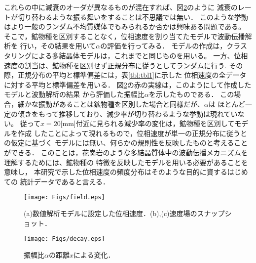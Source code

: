 これらの中に減衰のオーダが異なるものが混在すれば、図\ref{fig:fig17}のように
減衰のレートが切り替わるような振る舞いをすることは不思議では無い．
このような挙動はより一般のランダム不均質媒体でもみられるか否かは興味ある問題である。
そこで，鉱物種を区別することなく，位相速度を割り当てたモデルで波動伝播解析を
行い，その結果を用いて$\alpha$の評価を行ってみる．
モデルの作成は，クラスタリングによる多結晶体モデルは，これまでと同じものを用いる。
一方、位相速度の割当は、鉱物種を区別せず正規分布に従うとしてランダムに行う.
その際，正規分布の平均と標準偏差には，表\ref{tbl:tbl1}に示した
位相速度の全データに対する平均と標準偏差を用いる．
図\ref{fig:fig17}の赤の実線は，このようにして作成したモデルと波動解析の結果
から評価した振幅比$\alpha$を示したものである．
この場合，細かな振動があることは鉱物種を区別した場合と同様だが、$\alpha$は
ほとんど一定の傾きをもって推移しており、減少率が切り替わるような挙動は現れていない。
従って$x=20$[mm]付近に見られる減少率の変化は，鉱物種を区別してモデルを作成
したことによって現れるもので，位相速度が単一の正規分布に従うとの仮定に基づく
モデルには無い、何らかの規則性を反映したものと考えることができる．
このことは，花崗岩のような多結晶質体中の波動伝播メカニズムを理解するためには、鉱物種の
特徴を反映したモデルを用いる必要があることを意味し，
本研究で示した位相速度の頻度分布はそのような目的に資するはじめての
統計データであると言える．
\begin{figure}
\begin{center}
	\texttt{[image: Figs/field.eps]}
	\caption{(a)数値解析モデルに設定した位相速度．(b),(c)速度場のスナップショット．}
	\label{fig:fig16}
\end{center}
\end{figure}
\begin{figure}
\begin{center}
	\texttt{[image: Figs/decay.eps]}
	\caption{振幅比$\alpha$の距離$x$による変化．}
	\label{fig:fig17}
\end{center}
\end{figure}
